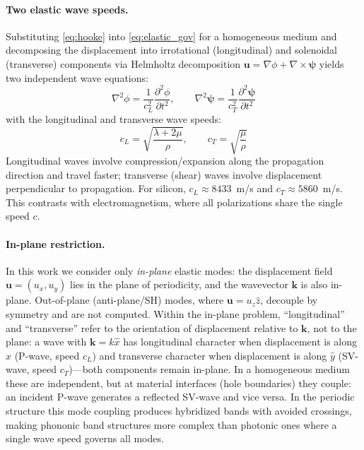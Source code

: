 \documentclass[11pt]{article}
\begin{document}
\paragraph{Two elastic wave speeds.} Substituting \cref{eq:hooke} into \cref{eq:elastic_gov} for a homogeneous medium and decomposing the displacement into irrotational (longitudinal) and solenoidal (transverse) components via Helmholtz decomposition $\mathbf{u} = \nabla \phi + \nabla \times \boldsymbol{\psi}$ yields two independent wave equations:
\begin{equation}
    \nabla^2 \phi = \frac{1}{c_L^2}\frac{\partial^2 \phi}{\partial t^2}, \qquad
    \nabla^2 \boldsymbol{\psi} = \frac{1}{c_T^2}\frac{\partial^2 \boldsymbol{\psi}}{\partial t^2}
\end{equation}
with the longitudinal and transverse wave speeds:
\begin{equation}
    c_L = \sqrt{\frac{\lambda + 2\mu}{\rho}}, \qquad c_T = \sqrt{\frac{\mu}{\rho}}
    \label{eq:wave_speeds}
\end{equation}
Longitudinal waves involve compression/expansion along the propagation direction and travel faster; transverse (shear) waves involve displacement perpendicular to propagation. For silicon, $c_L \approx 8433$~\si{m/s} and $c_T \approx 5860$~\si{m/s}. This contrasts with electromagnetism, where all polarizations share the single speed $c$.

\paragraph{In-plane restriction.} In this work we consider only \emph{in-plane} elastic modes: the displacement field $\mathbf{u} = (u_x, u_y)$ lies in the plane of periodicity, and the wavevector $\mathbf{k}$ is also in-plane. Out-of-plane (anti-plane/SH) modes, where $\mathbf{u} = u_z \hat{z}$, decouple by symmetry and are not computed. Within the in-plane problem, ``longitudinal'' and ``transverse'' refer to the orientation of displacement relative to $\mathbf{k}$, not to the plane: a wave with $\mathbf{k} = k\hat{x}$ has longitudinal character when displacement is along $\hat{x}$ (P-wave, speed $c_L$) and transverse character when displacement is along $\hat{y}$ (SV-wave, speed $c_T$)---both components remain in-plane. In a homogeneous medium these are independent, but at material interfaces (hole boundaries) they couple: an incident P-wave generates a reflected SV-wave and vice versa. In the periodic structure this mode coupling produces hybridized bands with avoided crossings, making phononic band structures more complex than photonic ones where a single wave speed governs all modes.
\end{document}
